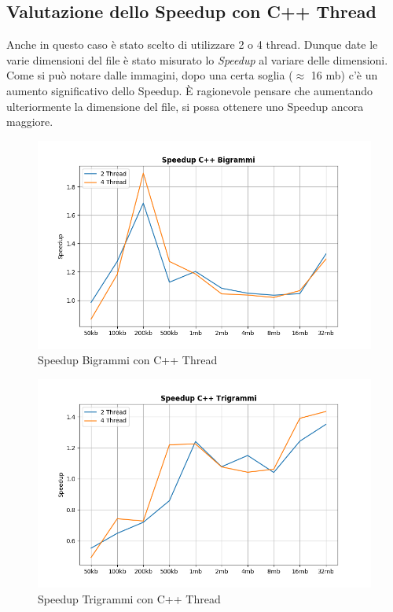 \documentclass[10pt,twocolumn,letterpaper]{article}
\begin{document}
\subsection{Valutazione dello Speedup con C++ Thread}
Anche in questo caso è stato scelto di utilizzare 2 o 4 thread.
Dunque date le varie dimensioni del file è stato misurato lo \textit{Speedup} al variare delle dimensioni.\newline
Come si può notare dalle immagini, dopo una certa soglia ($\approx$ 16 mb) c'è un aumento significativo dello Speedup.\newline
È ragionevole pensare che aumentando ulteriormente la dimensione del file, si possa ottenere uno Speedup ancora maggiore.

\begin{figure}[h]
\includegraphics[width=\linewidth]{Plots/speedup_cpp_bigrammi.png}
\caption{Speedup Bigrammi con C++ Thread}
\end{figure}

\begin{figure}[h]
\includegraphics[width=\linewidth]{Plots/speedup_cpp_trigrammi.png}
\caption{Speedup Trigrammi con C++ Thread}
\end{figure}
\newpage
\end{document}
